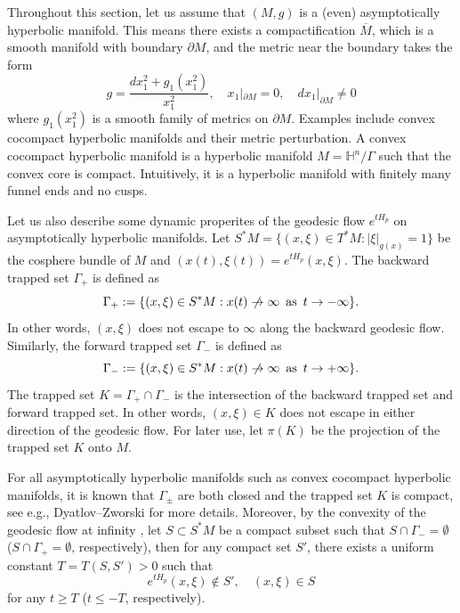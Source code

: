 \documentclass[10pt]{amsart}
\newcommand{\1}{{\bf 1}}
\begin{document}
Throughout this section, let us assume that
$(M,g)$ is a (even) asymptotically hyperbolic manifold. This means there exists a compactification $\overline{M}$, which is a smooth manifold with boundary $\partial M$, and the metric near the boundary takes the form
\begin{equation*}
    g=\frac{dx_1^2+g_1(x_1^2)}{x_1^2}, \quad x_1|_{\partial M}=0,\quad dx_1|_{\partial M}\neq 0
\end{equation*}
where $g_1(x_1^2)$ is a smooth family of metrics on $\partial M$. Examples include convex cocompact hyperbolic manifolds and their metric perturbation. A convex cocompact hyperbolic manifold is a hyperbolic manifold $M=\mathbb{H}^{n}/\Gamma$ such that the convex core is compact. Intuitively, it is a hyperbolic manifold with finitely many funnel ends and no cusps.


Let us also describe some dynamic properites of the geodesic flow $e^{tH_p}$ on asymptotically hyperbolic manifolds.
Let $S^*M=\{(x,\xi)\in T^*M: |\xi|_{g(x)}=1\}$ be the cosphere bundle of $M$ and $(x(t),\xi(t))=e^{tH_p}(x,\xi)$. The backward trapped set $\Gamma_+$ is defined as 
 \begin{equation*}
        \Gamma_+:=\{(x,\xi)\in S^*M:  x(t)\centernot\to \infty \,\,\,\text{as}\,\,\,t \to -\infty\}.
    \end{equation*}
    In other words, $(x,\xi)$ does not escape to $\infty$ along the backward geodesic flow. Similarly, the 
    forward trapped set $\Gamma_-$ is defined as
    \begin{equation*}
        \Gamma_-:=\{(x,\xi)\in S^*M: x(t)\centernot\to \infty \,\,\,\text{as}\,\,\,t \to +\infty \}.
    \end{equation*}
  The trapped set $K=\Gamma_+\cap \Gamma_-$ is the intersection of the backward trapped set and forward trapped set. In other words, $(x,\xi)\in K$ does not escape in either direction of the geodesic flow. For later use, let $\pi(K)$ be the projection of the trapped set $K$ onto $M$.

For all asymptotically hyperbolic manifolds such as convex cocompact hyperbolic manifolds, it is known that $\Gamma_\pm$ 
are both closed and the trapped set $K$ is compact, see 
e.g., Dyatlov--Zworski \cite[Chapter 6]{dyatlov2019mathematical} for more details. 
{Moreover, by the convexity of the geodesic flow at infinity \cite[Lemma 6.6]{dyatlov2019mathematical}, let $S\subset S^*M$ be a compact subset such that $S\cap \Gamma_-=\emptyset$ ($S\cap \Gamma_+=\emptyset$, respectively), then for any compact set $S'$, there exists a uniform constant $T=T(S,S')>0$ such that 
\begin{equation}\label{eq:convex}
    e^{tH_p}(x,\xi) \notin S',\quad (x,\xi)\in S
\end{equation}
for any $t\geq T$ ($t\leq -T$, respectively).
}
\end{document}
